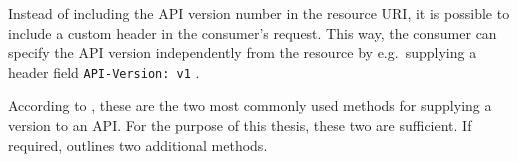 Instead of including the \ac{API} version number in the resource \ac{URI}, it
is possible to include a custom header in the consumer's request. This way, the
consumer can specify the \ac{API} version independently from the resource by
e.g.\ supplying a header field \texttt{API-Version: v1}
\autocite{MicrosoftAPIdesign2018}.

According to \autocite{MicrosoftAPIdesign2018}, these are the two most commonly
used methods for supplying a version to an \ac{API}. For the purpose of this
thesis, these two are sufficient. If required,
\autocite{MicrosoftAPIdesign2018} outlines two additional methods.
